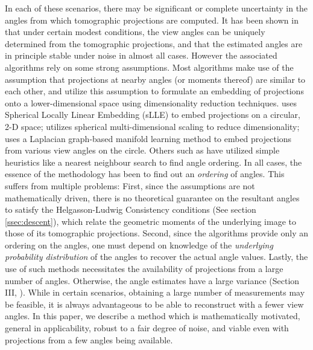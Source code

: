 \documentclass{article}
\begin{document}
In each of these scenarios, there may be significant or complete uncertainty in the angles from which tomographic projections are computed. It has been shown in \cite{uniqueness} that under certain modest conditions, the view angles can be uniquely determined from the tomographic projections, and that the estimated angles are in principle stable under noise \cite{feasibility} in almost all cases. However the associated algorithms rely on some strong assumptions. Most algorithms make use of the assumption that projections at nearby angles (or moments thereof) are similar to each other, and utilize this assumption to formulate an embedding of projections onto a lower-dimensional space using dimensionality reduction techniques. \cite{fangslle} uses Spherical Locally Linear Embedding (sLLE) to embed projections on a circular, 2-D space; \cite{fangmds} utilizes spherical multi-dimensional scaling to reduce dimensionality; \cite{graphlaplacian} uses a Laplacian graph-based manifold learning method to embed projections from various view angles on the circle. Others such as \cite{feasibility} have utilized simple heuristics like a nearest neighbour search to find angle ordering. In all cases, the essence of the methodology has been to find out an \textit{ordering} of angles. This suffers from multiple problems: First, since the assumptions are not mathematically driven, there is no theoretical guarantee on the resultant angles to satisfy the Helgasson-Ludwig Consistency conditions (See section \ref{ssec:descent}), which relate the geometric moments of the underlying image to those of its tomographic projections. Second, since the algorithms provide only an ordering on the angles, one must depend on knowledge of the \emph{underlying probability distribution} of the angles to recover the actual angle values. Lastly, the use of such methods necessitates the availability of projections from a large number of angles. Otherwise, the angle estimates have a large variance (Section III, \cite{graphlaplacian}). While in certain scenarios, obtaining a large number of measurements may be feasible, it is always advantageous to be able to reconstruct with a fewer view angles.
In this paper, we describe a method which is mathematically motivated, general in applicability, robust to a fair degree of noise, and viable even with projections from a few angles being available.
\end{document}

